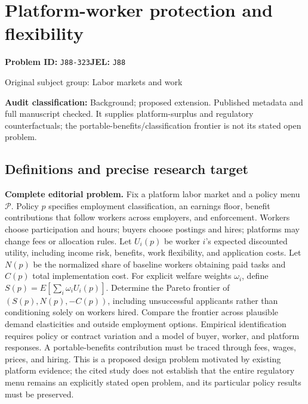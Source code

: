 \documentclass[11pt,a4paper]{article}
\begin{document}
\section*{Platform-worker protection and flexibility}
\textbf{Problem ID:} \texttt{J88-323}\quad \textbf{JEL:} \texttt{J88}\par
\label{problem:OP-0357}
{\sffamily\small\color{muted}Original subject group: Labor markets and work\par}
\label{definitions:problem:30007639}
\textbf{Audit classification:} Background; proposed extension. Published metadata and full manuscript checked. It supplies platform-surplus and regulatory counterfactuals; the portable-benefits/classification frontier is not its stated open problem.
\subsection*{Definitions and precise research target}
\textbf{Complete editorial problem.} Fix a platform labor market and a policy menu \(\mathcal P\). Policy \(p\) specifies employment classification, an earnings floor, benefit contributions that follow workers across employers, and enforcement. Workers choose participation and hours; buyers choose postings and hires; platforms may change fees or allocation rules. Let \(U_i(p)\) be worker \(i\)'s expected discounted utility, including income risk, benefits, work flexibility, and application costs. Let \(N(p)\) be the normalized share of baseline workers obtaining paid tasks and \(C(p)\) total implementation cost. For explicit welfare weights \(\omega_i\), define \(S(p)=E[\sum_i\omega_iU_i(p)]\). Determine the Pareto frontier of \((S(p),N(p),-C(p))\), including unsuccessful applicants rather than conditioning solely on workers hired. Compare the frontier across plausible demand elasticities and outside employment options. Empirical identification requires policy or contract variation and a model of buyer, worker, and platform responses. A portable-benefits contribution must be traced through fees, wages, prices, and hiring. This is a proposed design problem motivated by existing platform evidence; the cited study does not establish that the entire regulatory menu remains an explicitly stated open problem, and its particular policy results must be preserved.
\end{document}
